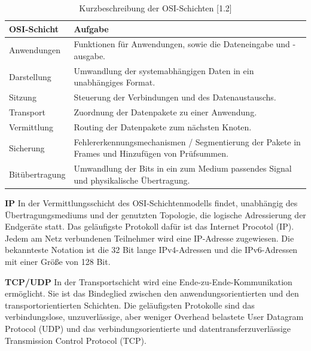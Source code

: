 \newpage

\begin{table}[]
\begin{center}
    \begin{tabular}{| l | p{8cm} |}
    \hline
     OSI-Schicht & Aufgabe \\ 
     \hline
        
       Anwendungen & Funktionen für Anwendungen, sowie die Dateneingabe und -ausgabe. \\
    \hline    
       Darstellung & Umwandlung der systemabhängigen Daten in ein unabhängiges Format.  \\
    \hline   
       Sitzung & Steuerung der Verbindungen und des Datenaustauschs.  \\
    \hline  
        Transport & Zuordnung der Datenpakete zu einer Anwendung. \\ 
    
    \hline     
    	Vermittlung & Routing der Datenpakete zum nächsten Knoten. \\
	
    \hline       
      Sicherung & Fehlererkennungsmechanismen / Segmentierung der Pakete in Frames und Hinzufügen von Prüfsummen.  \\   
    \hline
    
    Bitübertragung & Umwandlung der Bits in ein zum Medium passendes Signal und physikalische Übertragung.\\ 
    \hline    
    \end{tabular}
\end{center}
\caption{Kurzbeschreibung der OSI-Schichten [1.2]}
\end{table}

\textbf{IP}
\newline
In der Vermittlungsschicht des OSI-Schichtenmodells findet, unabhängig des Übertragungsmediums und der genutzten Topologie, die logische Adressierung der Endgeräte statt. Das geläufigste Protokoll dafür ist das Internet Procotol (IP). Jedem am Netz verbundenen Teilnehmer wird eine IP-Adresse zugewiesen. Die bekannteste Notation ist die 32 Bit lange IPv4-Adressen und die IPv6-Adressen mit einer Größe von 128 Bit. 
\newline

\textbf{TCP/UDP}
\newline
In der Transportschicht wird eine Ende-zu-Ende-Kommunikation ermöglicht. Sie ist das Bindeglied zwischen den anwendungsorientierten und den transportorientierten Schichten. Die geläufigsten Protokolle sind das verbindungslose, unzuverlässige, aber weniger Overhead belastete User Datagram Protocol (UDP) und das verbindungsorientierte und datentransferzuverlässige Transmission Control Protocol (TCP).

